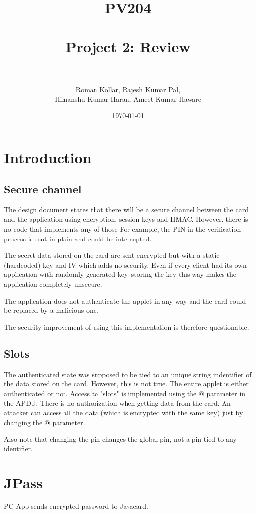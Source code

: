 \documentclass[paper=a4, fontsize=12pt]{scrartcl}
\title{
\normalfont \normalsize
\textsc{PV204} \\ [25pt]
\horrule{0.5pt} \\[0.4cm]
\huge Project 2: Review  \\
\horrule{2pt} \\[0.5cm]
}
\author{Roman Kollar, Rajesh Kumar Pal,\\Himanshu Kumar Haran, Ameet Kumar Haware}
\date{\normalsize\today}
\begin{document}
\maketitle

\section{Introduction}
\subsection{Secure channel}
The design document states that there will be a secure channel between the card and the application using encryption, session keys and HMAC.
However, there is no code that implements any of those
For example, the PIN in the verification process is sent in plain and could be intercepted.

The secret data stored on the card are sent encrypted but with a static (hardcoded) key and IV which adds no security.
Even if every client had its own application with randomly generated key, storing the key this way makes the application completely unsecure.

The application does not authenticate the applet in any way and the card could be replaced by a malicious one.

The security improvement of using this implementation is therefore questionable.

\subsection{Slots}
The authenticated state was supposed to be tied to an unique string indentifier of the data stored on the card.
However, this is not true.
The entire applet is either authenticated or not.
Access to "slots" is implemented using the @ parameter in the APDU.
There is no authorization when getting data from the card.
An attacker can access all the data (which is encrypted with the same key) just by changing the @ parameter.

Also note that changing the pin changes the global pin, not a pin tied to any identifier.

\section{JPass}
PC-App sends encrypted password to Javacard.
\end{document}
